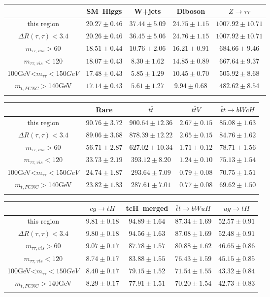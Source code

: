 \centering
\begin{tabular}{ccccc} \toprule\toprule
 & SM~Higgs & W+jets & Diboson & $Z\to \tau\tau$\\\midrule
this region & $20.27\pm0.46$ & $37.44\pm5.09$ & $24.75\pm1.15$ & $1007.92\pm10.71$\\
$\Delta R(\tau,\tau)<3.4$ & $20.26\pm0.46$ & $36.45\pm5.06$ & $24.76\pm1.15$ & $1007.92\pm10.71$\\
$m_{\tau\tau,vis}>60$ & $18.51\pm0.44$ & $10.76\pm2.06$ & $16.21\pm0.91$ & $684.66\pm9.46$\\
$m_{\tau\tau,vis}<120$ & $18.07\pm0.43$ & $8.30\pm1.62$ & $14.85\pm0.89$ & $667.64\pm9.37$\\
100GeV<$m_{\tau\tau}<150GeV$ & $17.48\pm0.43$ & $5.85\pm1.29$ & $10.45\pm0.70$ & $505.92\pm8.68$\\
$m_{t,FCNC}>$140GeV & $17.14\pm0.43$ & $5.61\pm1.27$ & $9.94\pm0.68$ & $482.62\pm8.54$\\
\bottomrule\bottomrule\\
\end{tabular}
\begin{tabular}{ccccc} \toprule\toprule
 & Rare & $t\bar{t}$ & $t\bar{t}V$ & $\bar{t}t\to bWcH$\\\midrule
this region & $90.76\pm3.72$ & $900.64\pm12.36$ & $2.67\pm0.15$ & $85.08\pm1.63$\\
$\Delta R(\tau,\tau)<3.4$ & $89.06\pm3.68$ & $878.39\pm12.22$ & $2.65\pm0.15$ & $84.76\pm1.62$\\
$m_{\tau\tau,vis}>60$ & $56.71\pm2.87$ & $627.02\pm10.34$ & $1.71\pm0.12$ & $78.71\pm1.56$\\
$m_{\tau\tau,vis}<120$ & $33.73\pm2.19$ & $393.12\pm8.20$ & $1.24\pm0.10$ & $75.13\pm1.54$\\
100GeV<$m_{\tau\tau}<150GeV$ & $24.74\pm1.87$ & $293.64\pm7.09$ & $0.79\pm0.08$ & $70.75\pm1.51$\\
$m_{t,FCNC}>$140GeV & $23.82\pm1.83$ & $287.61\pm7.01$ & $0.77\pm0.08$ & $69.62\pm1.50$\\
\bottomrule\bottomrule\\
\end{tabular}
\begin{tabular}{ccccc} \toprule\toprule
 & $cg\to tH$ & tcH~merged & $\bar{t}t\to bWuH$ & $ug\to tH$\\\midrule
this region & $9.81\pm0.18$ & $94.89\pm1.64$ & $87.34\pm1.69$ & $52.57\pm0.91$\\
$\Delta R(\tau,\tau)<3.4$ & $9.80\pm0.18$ & $94.56\pm1.63$ & $87.08\pm1.69$ & $52.48\pm0.91$\\
$m_{\tau\tau,vis}>60$ & $9.07\pm0.17$ & $87.78\pm1.57$ & $80.88\pm1.62$ & $46.65\pm0.86$\\
$m_{\tau\tau,vis}<120$ & $8.74\pm0.17$ & $83.88\pm1.55$ & $76.43\pm1.59$ & $45.15\pm0.85$\\
100GeV<$m_{\tau\tau}<150GeV$ & $8.40\pm0.17$ & $79.15\pm1.52$ & $71.54\pm1.55$ & $43.32\pm0.84$\\
$m_{t,FCNC}>$140GeV & $8.29\pm0.17$ & $77.91\pm1.51$ & $70.20\pm1.54$ & $42.73\pm0.83$\\
\bottomrule\bottomrule\\
\end{tabular}
